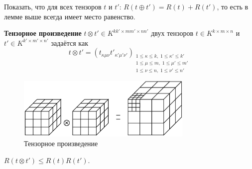 \begin{reseach}\label{res:bi:4.1}
	Показать, что для всех тензоров $t$ и $t'$: $R(t \oplus t') = R(t) + R(t')$, то есть в лемме выше всегда имеет место равенство.
\end{reseach}

\textbf{Тензорное произведение} $t \otimes t' \in K^{kk' \times mm' \times nn'}$ двух тензоров $t \in K^{k \times m \times n}$ и $t' \in K^{k' \times m' \times n'}$ задаётся как 
\[
	t \otimes t' = \left( t_{\kappa \mu \nu} t'_{\kappa' \mu' \nu'} \right)_{\substack{
		1 \leq \kappa \leq k, \; 1 \leq \kappa' \leq k' \\
		1 \leq \mu \leq m, \; 1 \leq \mu' \leq m'\\
		1 \leq \nu \leq n, \; 1 \leq \nu' \leq n'}}
\]
\begin{figure}[H]
	\centering
    \includegraphics[width=0.75\textwidth]{figures/tensor_product}
	\caption{Тензорное произведение}
	\label{fig:tensor_product}
\end{figure}
\begin{lemma}
  $R \left( t \otimes t' \right) \leq R(t) R(t')$. 
\end{lemma}
